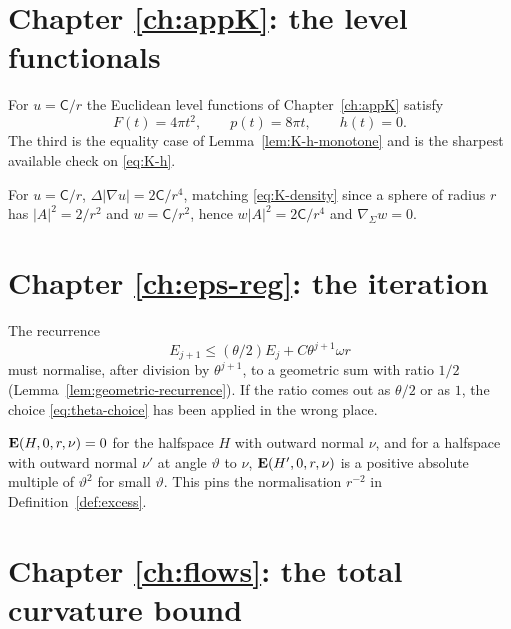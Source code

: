 \section{Chapter \ref{ch:appK}: the level functionals}

\begin{test}\label{test:K-model}
For $u=\mathsf C/r$ the Euclidean level functions of
Chapter~\ref{ch:appK} satisfy
\[
  F(t)=4\pi t^2,
  \qquad
  p(t)=8\pi t,
  \qquad
  h(t)=0 .
\]
The third is the equality case of Lemma~\ref{lem:K-h-monotone} and is the
sharpest available check on \eqref{eq:K-h}.
\end{test}

\begin{test}\label{test:K-bochner}
For $u=\mathsf C/r$, $\Delta|\nabla u|=2\mathsf C/r^4$, matching
\eqref{eq:K-density} since a sphere of radius $r$ has
$|A|^2=2/r^2$ and $w=\mathsf C/r^2$, hence
$w|A|^2=2\mathsf C/r^4$ and $\nabla_\Sigma w=0$.
\end{test}

\section{Chapter \ref{ch:eps-reg}: the iteration}

\begin{test}\label{test:recurrence}
The recurrence
\[
  E_{j+1}\le(\theta/2)E_j+C\theta^{j+1}\omega r
\]
must normalise, after division by $\theta^{j+1}$, to a geometric sum with
ratio $1/2$ (Lemma~\ref{lem:geometric-recurrence}).  If the ratio comes out
as $\theta/2$ or as $1$, the choice \eqref{eq:theta-choice} has been applied in
the wrong place.
\end{test}

\begin{test}
\label{test:excess-values}
$\operatorname{\mathbf E}(H,0,r,\nu)=0$ for the halfspace $H$ with outward normal $\nu$, and for a
halfspace with outward normal $\nu'$ at angle $\vartheta$ to $\nu$,
$\operatorname{\mathbf E}(H',0,r,\nu)$ is a positive absolute multiple of $\vartheta^2$ for small
$\vartheta$.  This pins the normalisation $r^{-2}$ in
Definition~\ref{def:excess}.
\end{test}

\section{Chapter \ref{ch:flows}: the total curvature bound}

